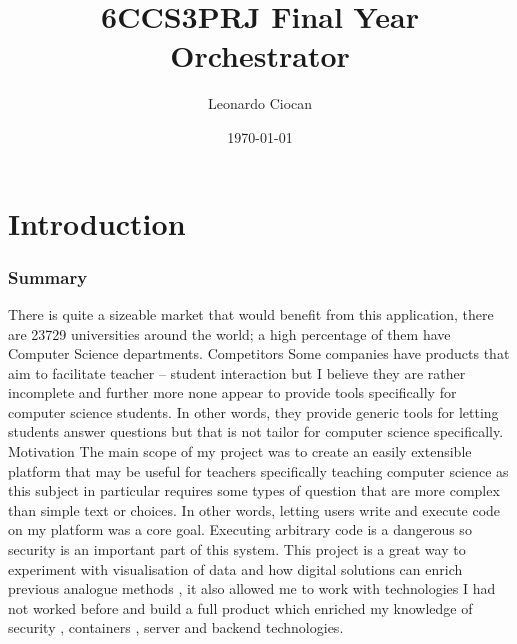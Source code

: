 \documentclass[11pt]{informatics-report}
\title{6CCS3PRJ Final Year\\\vspace{0.2cm}Orchestrator}
\author{Leonardo Ciocan}
\date{\today}
\begin{document}
\createFrontMatter
\doublespacing
\tableofcontents
\doublespacing


\chapter{Introduction}
\subsection{Summary}
There is quite a sizeable market that would benefit from this application, there are 23729 universities around the world; a high percentage of them have Computer Science departments.
Competitors
Some companies have products that aim to facilitate teacher – student interaction but I believe they are rather incomplete and further more none appear to provide tools specifically for computer science students. In other words, they provide generic tools for letting students answer questions but that is not tailor for computer science specifically.
Motivation
The main scope of my project was to create an easily extensible platform that may be useful for teachers specifically teaching computer science as this subject in particular requires some types of question that are more complex than simple text or choices. In other words, letting users write and execute code on my platform was a core goal. Executing arbitrary code is a dangerous so security is an important part of this system.
This project is a great way to experiment with visualisation of data and how digital solutions can enrich previous analogue methods , it also allowed me to work with technologies I had not worked before and build a full product which enriched my knowledge of security , containers , server and backend technologies.
\end{document}
